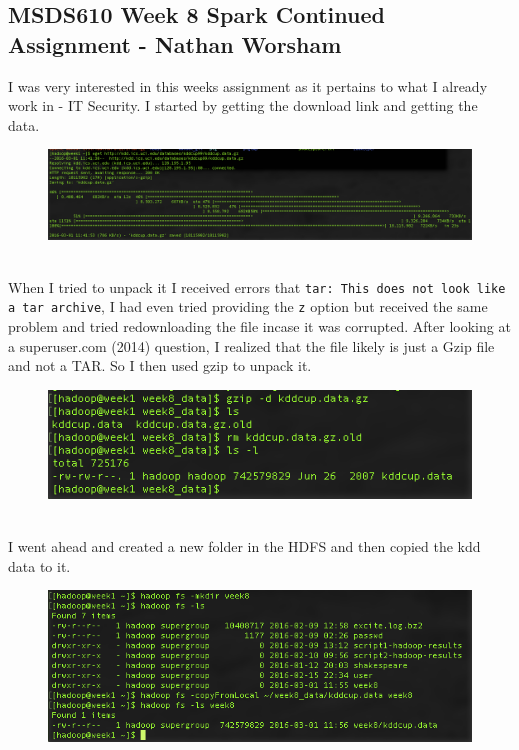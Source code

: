 \documentclass[10pt]{article}
\begin{document}
\subsection*{MSDS610 Week 8 Spark Continued Assignment - Nathan Worsham}
I was very interested in this weeks assignment as it pertains to what I already work in - IT Security. I started by getting the download link and getting the data.
\begin{figure}[!h]
\includegraphics[scale=0.37]{wget.png}
\centering
\end{figure}\\
\indent When I tried to unpack it I received errors that \verb|tar: This does not look like a tar archive|, I had even tried providing the \verb|z| option but received the same problem and tried redownloading the file incase it was corrupted. After looking at a superuser.com (2014) question, I realized that the file likely is just a Gzip file and not a TAR. So I then used gzip to unpack it. 
\begin{figure}[!h]
\includegraphics[scale=0.37]{gzip.png}
\centering
\end{figure}\\
\indent I went ahead and created a new folder in the HDFS and then copied the kdd data to it.
\begin{figure}[!h]
\includegraphics[scale=0.37]{copyfromlocal.png}
\centering
\end{figure}\\
\end{document}
